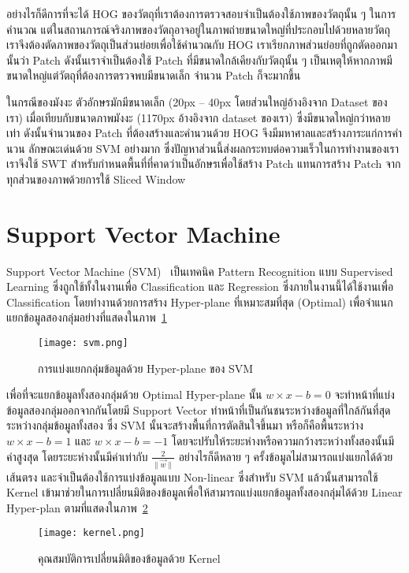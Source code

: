อย่างไรก็ดีการที่จะได้ HOG ของวัตถุที่เราต้องการตรวจสอบจำเป็นต้องใช้ภาพของวัตถุนั้น ๆ ในการคำนวณ แต่ในสถานการณ์จริงภาพของวัตถุอาจอยู่ในภาพถ่ายขนาดใหญ่ที่ประกอบไปด้วยหลายวัตถุ เราจึงต้องตัดภาพของวัตถุเป็นส่วนย่อยเพื่อใช้คำนวณกับ HOG เราเรียกภาพส่วนย่อยที่ถูกตัดออกมานั้นว่า Patch ดังนั้นเราจำเป็นต้องใช้ Patch ที่มีขนาดใกล้เคียงกับวัตถุนั้น ๆ เป็นเหตุให้หากภาพมีขนาดใหญ่แต่วัตถุที่ต้องการตรวจพบมีขนาดเล็ก จำนวน Patch ก็จะมากขึ้น

ในกรณีของมังงะ ตัวอักษรมักมีขนาดเล็ก (20px – 40px โดยส่วนใหญ่อ้างอิงจาก Dataset ของเรา) เมื่อเทียบกับขนาดภาพมังงะ (1170px อ้างอิงจาก dataset ของเรา) ซึ่งมีขนาดใหญ่กว่าหลายเท่า ดังนั้นจำนวนของ Patch ที่ต้องสร้างและคำนวนด้วย HOG จึงมีมหาศาลและสร้างภาระแก่การคำนวน ลักษณะเด่นด้วย SVM อย่างมาก ซึ่งปัญหาส่วนนี้ส่งผลกระทบต่อความเร็วในการทำงานของเรา เราจึงใช้ SWT สำหรับกำหนดพื้นที่ที่คาดว่าเป็นอักษรเพื่อใช้สร้าง Patch แทนการสร้าง Patch จากทุกส่วนของภาพด้วยการใช้ Sliced Window

\section{Support Vector Machine}

Support Vector Machine (SVM)~\cite{Suykens1999} เป็นเทคนิค Pattern Recognition แบบ Supervised Learning ซึ่งถูกใช้ทั้งในงานเพื่อ Classification และ Regression ซึ่งภายในงานนี้ได้ใช้งานเพื่อ Classification โดยทำงานด้วยการสร้าง Hyper-plane ที่เหมาะสมที่สุด (Optimal) เพื่อจำแนกแยกข้อมูลสองกลุ่มอย่างที่แสดงในภาพ~\ref{Fig:svm}

\begin{figure}[!h]
    \centering
    \texttt{[image: svm.png]}
    \caption{การแบ่งแยกกลุ่มข้อมูลด้วย Hyper-plane ของ SVM}
    \label{Fig:svm}
\end{figure}

เพื่อที่จะแยกข้อมูลทั้งสองกลุ่มด้วย Optimal Hyper-plane นั้น $w \times x - b = 0$ จะทำหน้าที่แบ่งข้อมูลสองกลุ่มออกจากกันโดยมี Support Vector ทำหน้าที่เป็นกันชนระหว่างข้อมูลที่ใกล้กันที่สุดระหว่างกลุ่มข้อมูลทั้งสอง ซึ่ง SVM นั้นจะสร้างพื้นที่การตัดสินใจขึ้นมา หรือก็คือพื้นระหว่าง $w \times x - b = 1$ และ $w \times x - b = -1$ โดยจะปรับให้ระยะห่างหรือความกว้างระหว่างทั้งสองนั้นมีค่าสูงสุด โดยระยะห่างนั้นมีค่าเท่ากับ $\frac{2}{\|\vec {w}\|}$ อย่างไรก็ดีหลาย ๆ ครั้งข้อมูลไม่สามารถแบ่งแยกได้ด้วยเส้นตรง และจำเป็นต้องใช้การแบ่งข้อมูลแบบ Non-linear ซึ่งสำหรับ SVM แล้วนั้นสามารถใช้ Kernel เข้ามาช่วยในการเปลี่ยนมิติของข้อมูลเพื่อให้สามารถแบ่งแยกข้อมูลทั้งสองกลุ่มได้ด้วย Linear Hyper-plan ตามที่แสดงในภาพ~\ref{Fig:kernel}

\begin{figure}[!h]
    \centering
    \texttt{[image: kernel.png]}
    \caption{คุณสมบัติการเปลี่ยนมิติของข้อมูลด้วย Kernel}
    \label{Fig:kernel}
\end{figure}

